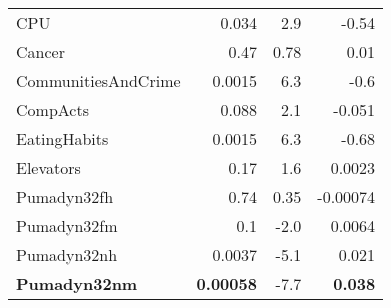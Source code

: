 \begin{tabular}{lrrr}
	CPU                                       & 0.034                          & 2.9                           & -0.54                                \\
	Cancer                                    & 0.47                           & 0.78                          & 0.01                                 \\
	CommunitiesAndCrime                       & 0.0015                         & 6.3                           & -0.6                                 \\
	CompActs                                  & 0.088                          & 2.1                           & -0.051                               \\
	\addlinespace
	EatingHabits                              & 0.0015                         & 6.3                           & -0.68                                \\
	Elevators                                 & 0.17                           & 1.6                           & 0.0023                               \\
	Pumadyn32fh                               & 0.74                           & 0.35                          & -0.00074                             \\
	Pumadyn32fm                               & 0.1                            & -2.0                          & 0.0064                               \\
	Pumadyn32nh                               & 0.0037                         & -5.1                          & 0.021                                \\
	\addlinespace
	\rowcolor[gray]{0.85}\textbf{Pumadyn32nm} & \textbf{0.00058}               & -7.7                          & \textbf{0.038}                       \\

\end{tabular}
